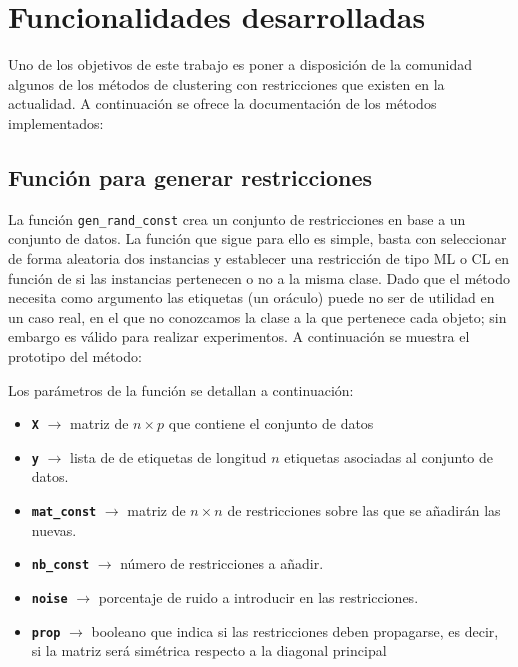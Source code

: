 \section{Funcionalidades desarrolladas}

Uno de los objetivos de este trabajo es poner a disposición de la comunidad algunos de los métodos de clustering con restricciones que existen en la actualidad. A continuación se ofrece la documentación de los métodos implementados:

\subsection{Función para generar restricciones}

La función \texttt{gen\_rand\_const} crea un conjunto de restricciones en base a un conjunto de datos. La función que sigue para ello es simple, basta con seleccionar de forma aleatoria dos instancias y establecer una restricción de tipo \acs{ML} o \acs{CL} en función de si las instancias pertenecen o no a la misma clase. Dado que el método necesita como argumento las etiquetas (un oráculo) puede no ser de utilidad en un caso real, en el que no conozcamos la clase a la que pertenece cada objeto; sin embargo es válido para realizar experimentos. A continuación se muestra el prototipo del método:



Los parámetros de la función se detallan a continuación:

\begin{itemize}

	\item \textbf{\texttt{X}} {$\longrightarrow$ matriz de $n \times p$ que contiene el conjunto de datos}
	
	\item \textbf{\texttt{y}} {$\longrightarrow$ lista de de etiquetas de longitud $n$ etiquetas asociadas al conjunto de datos.}
	
	\item \textbf{\texttt{mat\_const}} {$\longrightarrow$ matriz de $n \times n$ de restricciones sobre las que se añadirán las nuevas.}
	
	\item \textbf{\texttt{nb\_const}} {$\longrightarrow$ número de restricciones a añadir.}
	
	\item \textbf{\texttt{noise}} {$\longrightarrow$ porcentaje de ruido a introducir en las restricciones.}
	
	\item \textbf{\texttt{prop}} {$\longrightarrow$ booleano que indica si las restricciones deben propagarse, es decir, si la matriz será simétrica respecto a la diagonal principal}

\end{itemize}

